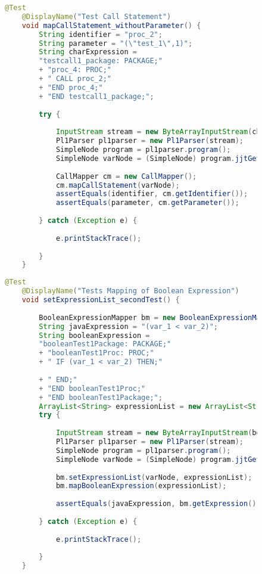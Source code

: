 \begin{figure}[H]
	\begin{lstlisting}[language=Java, caption=mapCallStatement Test, label={lst:callstatement_test}]
	@Test
	@DisplayName("Test Call Statement")
	void mapCallStatement_withoutParameter() {
		String identifier = "proc_2";
		String parameter = "(\"test_1\",1)";
		String charExpression = 
		"testcall1_package: PACKAGE;" 
		+ "proc_4: PROC;"
		+ "	CALL proc_2;" 
		+ "END proc_4;" 
		+ "END testcall1_package;";
		
		try {
			
			InputStream stream = new ByteArrayInputStream(charExpression.getBytes(StandardCharsets.UTF_8));
			Pl1Parser pl1parser = new Pl1Parser(stream);
			SimpleNode program = pl1parser.program();
			SimpleNode varNode = (SimpleNode) program.jjtGetChild(0).jjtGetChild(1).jjtGetChild(1).jjtGetChild(0);
			
			CallMapper cm = new CallMapper();
			cm.mapCallStatement(varNode);
			assertEquals(identifier, cm.getIdentifier());
			assertEquals(parameter, cm.getParameter());
			
		} catch (Exception e) {
			
			e.printStackTrace();
			
		}
	}
	\end{lstlisting}
\end{figure}

\begin{figure}[H]
	\begin{lstlisting}[language=Java, caption=setExpressionList Test, label={lst:branchmapping_test}]
	@Test
	@DisplayName("Tests Mapping of Boolean Expression")
	void setExpressionList_secondTest() {
		
		BooleanExpressionMapper bm = new BooleanExpressionMapper();
		String javaExpression = "(var_1 < var_2)";
		String booleanExpression = 
		"booleanTest1Package: PACKAGE;"
		+ "booleanTest1Proc: PROC;"
		+ "	IF (var_1 < var_2) THEN;"
		
		+ "	END;"
		+ "END booleanTest1Proc;"
		+ "END booleanTest1Package;";
		ArrayList<String> expressionList = new ArrayList<String>();
		try {
			
			InputStream stream = new ByteArrayInputStream(booleanExpression.getBytes(StandardCharsets.UTF_8));
			Pl1Parser pl1parser = new Pl1Parser(stream);
			SimpleNode program = pl1parser.program();
			SimpleNode varNode = (SimpleNode) program.jjtGetChild(0).jjtGetChild(1).jjtGetChild(1).jjtGetChild(0).jjtGetChild(0);
			
			bm.setExpressionList(varNode, expressionList);
			bm.mapBooleanExpression(expressionList);
			
			assertEquals(javaExpression, bm.getExpression());
			
		} catch (Exception e) {
			
			e.printStackTrace();
			
		}
	}
	\end{lstlisting}
\end{figure}

